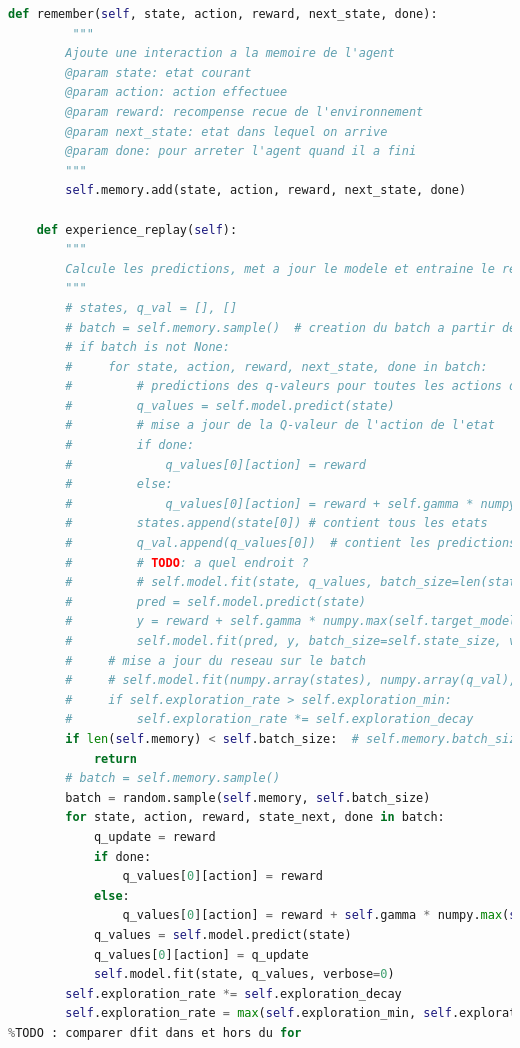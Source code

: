 \documentclass[10pt,a4paper]{article}
\begin{document}
\begin{lstlisting}[language=Python, caption=Programme principal de l'agent utilisant l'expérience replay]
    def remember(self, state, action, reward, next_state, done):
         """
        Ajoute une interaction a la memoire de l'agent
        @param state: etat courant
        @param action: action effectuee
        @param reward: recompense recue de l'environnement
        @param next_state: etat dans lequel on arrive
        @param done: pour arreter l'agent quand il a fini
        """
        self.memory.add(state, action, reward, next_state, done)

    def experience_replay(self):
        """
        Calcule les predictions, met a jour le modele et entraine le reseau
        """
        # states, q_val = [], []
        # batch = self.memory.sample()  # creation du batch a partir de la memoire de l'agent
        # if batch is not None:
        #     for state, action, reward, next_state, done in batch:
        #         # predictions des q-valeurs pour toutes les actions de l'etat
        #         q_values = self.model.predict(state)
        #         # mise a jour de la Q-valeur de l'action de l'etat
        #         if done:
        #             q_values[0][action] = reward
        #         else:
        #             q_values[0][action] = reward + self.gamma * numpy.max(self.target_model.predict(next_state)[0])
        #         states.append(state[0]) # contient tous les etats
        #         q_val.append(q_values[0])  # contient les predictions des q_valeurs
        #         # TODO: a quel endroit ?
        #         # self.model.fit(state, q_values, batch_size=len(states), verbose=0)
        #         pred = self.model.predict(state)
        #         y = reward + self.gamma * numpy.max(self.target_model.predict(next_state)[0])
        #         self.model.fit(pred, y, batch_size=self.state_size, verbose=0)
        #     # mise a jour du reseau sur le batch
        #     # self.model.fit(numpy.array(states), numpy.array(q_val), batch_size=len(states), verbose=0)
        #     if self.exploration_rate > self.exploration_min:
        #         self.exploration_rate *= self.exploration_decay
        if len(self.memory) < self.batch_size:  # self.memory.batch_size:
            return
        # batch = self.memory.sample()
        batch = random.sample(self.memory, self.batch_size)
        for state, action, reward, state_next, done in batch:
            q_update = reward
            if done:
                q_values[0][action] = reward
            else:
                q_values[0][action] = reward + self.gamma * numpy.max(self.target_model.predict(next_state
            q_values = self.model.predict(state)
            q_values[0][action] = q_update
            self.model.fit(state, q_values, verbose=0)
        self.exploration_rate *= self.exploration_decay
        self.exploration_rate = max(self.exploration_min, self.exploration_rate)
%TODO : comparer dfit dans et hors du for



\end{lstlisting}
\end{document}
